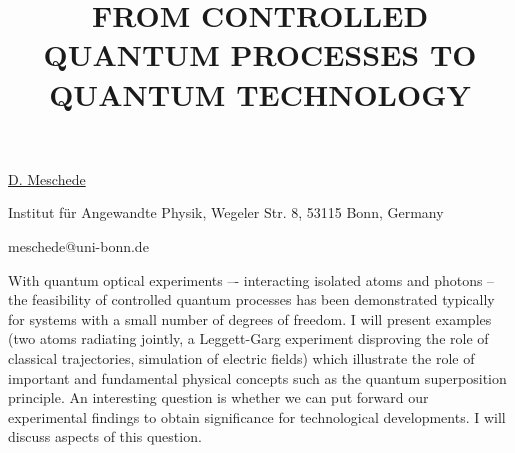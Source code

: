 \title{FROM CONTROLLED QUANTUM PROCESSES TO QUANTUM TECHNOLOGY}

\underline{D. Meschede} 

{\normalsize{\vspace{-4mm}
Institut f\"{u}r Angewandte Physik,
Wegeler Str. 8,
53115 Bonn,
Germany

\email meschede@uni-bonn.de}}

With quantum optical experiments –- interacting isolated atoms and photons -- the feasibility of controlled quantum processes has been demonstrated typically for systems with a small number of degrees of freedom. I will present examples (two atoms radiating jointly, a Leggett-Garg experiment disproving the role of classical trajectories, simulation of electric fields) which illustrate the role of important and fundamental physical concepts such as the quantum superposition principle.
An interesting question is whether we can put forward our experimental findings to obtain significance for technological developments. I will discuss aspects of this question.


\vspace{\baselineskip} 